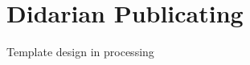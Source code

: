 \documentclass[12pt,letterpaper]{article}
\begin{document}
\section*{Didarian Publicating}
Template design in processing
\end{document}
